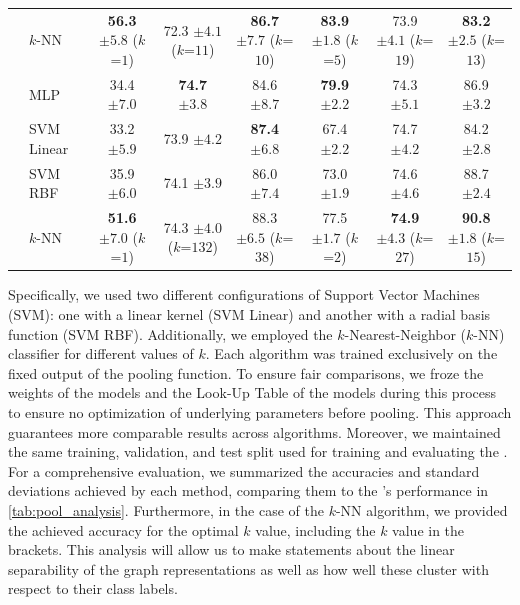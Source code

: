 \begin{table}[!htb]
{\begin{tabular}{@{}c <{\enspace}@{}lcccccc@{}}
			\\
			& \textsf{$k$-NN} &  \textbf{56.3} \scriptsize $\pm 5.8$ ($k$=$1$) & 72.3 \scriptsize $\pm 4.1$ ($k$=$11$)& \textbf{86.7} \scriptsize $\pm 7.7$ ($k$=$10$) & \textbf{83.9} \scriptsize $\pm 1.8$ ($k$=$5$)& 73.9 \scriptsize $\pm 4.1$ ($k$=$19$) & \textbf{83.2} \scriptsize $\pm 2.5$ ($k$=$13$)
			\\
			\cmidrule{2-8}
			\multirow{4}{*}{\rotatebox{90}{\gnn}}
			& \textsf{MLP} & 34.4 \scriptsize $\pm 7.0$ &  \textbf{74.7} \scriptsize $\pm 3.8$ & 84.6 \scriptsize $\pm 8.7$	 & \textbf{79.9} \scriptsize $\pm 2.2$ & 74.3 \scriptsize $\pm 5.1$ & 86.9 \scriptsize $\pm 3.2$
			\\
			& \textsf{SVM Linear} & 33.2 \scriptsize $\pm 5.9$ & 73.9 \scriptsize $\pm 4.2$ & \textbf{87.4} \scriptsize $\pm 6.8$ & 67.4 \scriptsize $\pm 2.2$ & 74.7 \scriptsize $\pm 4.2$ & 84.2 \scriptsize $\pm 2.8$
			\\
			& \textsf{SVM RBF} & 35.9 \scriptsize $\pm 6.0$ & 74.1 \scriptsize $\pm 3.9$ & 86.0 \scriptsize $\pm 7.4$ & 73.0 \scriptsize $\pm 1.9$ & 74.6 \scriptsize $\pm 4.6$ & 88.7 \scriptsize $\pm 2.4$
			\\ 
			& \textsf{$k$-NN} & \textbf{51.6} \scriptsize $\pm 7.0$ ($k$=$1$)	& 74.3 \scriptsize $\pm 4.0$ ($k$=$132$) & 88.3 \scriptsize $\pm 6.5$ ($k$=$38$) & 77.5 \scriptsize $\pm 1.7$ ($k$=$2$)& \textbf{74.9} \scriptsize $\pm 4.3$ ($k$=$27$) & \textbf{90.8} \scriptsize $\pm 1.8$ ($k$=$15$)
			\\
			\bottomrule
		\end{tabular}}                
\end{table}

Specifically, we used two different configurations of \textsf{Support Vector Machines (SVM)}: one with a linear kernel (\textsf{SVM Linear}) and another with a radial basis function (\textsf{SVM RBF}). Additionally, we employed the \textsf{$k$-Nearest-Neighbor ($k$-NN)} classifier for different values of $k$. Each algorithm was trained exclusively on the fixed output of the pooling function. To ensure fair comparisons, we froze the weights of the \gnn models and the Look-Up Table of the \wlnn models during this process to ensure no optimization of underlying parameters before pooling. This approach guarantees more comparable results across algorithms. Moreover, we maintained the same training, validation, and test split used for training and evaluating the \mlp. For a comprehensive evaluation, we summarized the accuracies and standard deviations achieved by each method, comparing them to the \mlp's performance in \cref{tab:pool_analysis}. Furthermore, in the case of the \textsf{$k$-NN} algorithm, we provided the achieved accuracy for the optimal $k$ value, including the $k$ value in the brackets. This analysis will allow us to make statements about the linear separability of the graph representations as well as how well these cluster with respect to their class labels.

